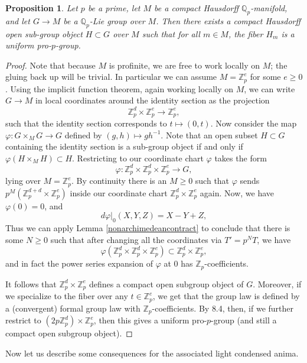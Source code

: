 \documentclass[12pt]{article}
\newtheorem{proposition}[theorem]{Proposition}
\newcommand{\mbb}{\mathbb}
\begin{document}
\begin{proposition}\label{localstructurepadiclie}
Let $p$ be a prime, let $M$ be a compact Hausdorff $\mathbb{Q}_p$-manifold, and let $G\to M$ be a $\mathbb{Q}_p$-Lie group over $M$.  Then there exists a compact Hausdorff open sub-group object $H\subset G$ over $M$ such that for all $m\in M$, the fiber $H_m$ is a uniform pro-$p$-group.
\end{proposition}
\begin{proof}
Note that because $M$ is profinite, we are free to work locally on $M$; the gluing back up will be trivial.  In particular we can assume $M=\mathbb{Z}_p^e$ for some $e\geq 0$.  Using the implicit function theorem, again working locally on $M$, we can write $G\to M$ in local coordinates around the identity section as the projection
$$\mathbb{Z}_p^d \times \mathbb{Z}_p^e \to \mathbb{Z}_p^e,$$
such that the identity section corresponds to $t\mapsto (0,t)$.  Now consider the map $\varphi: G\times_M G\to G$ defined by $(g,h)\mapsto gh^{-1}$.  Note that an open subset $H\subset G$ containing the identity section is a sub-group object if and only if $\varphi(H\times_M H)\subset H$. Restricting to our coordinate chart $\varphi$ takes the form
$$\varphi: \mbb{Z}_p^d\times \mbb{Z}_p^d\times\mbb{Z}_p^e \to G,$$
lying over $M=\mbb{Z}_p^e$.  By continuity there is an $M\geq 0$ such that $\varphi$ sends $p^M(\mbb{Z}_p^{d+d}\times\mbb{Z}_p^e)$ inside our coordinate chart $\mbb{Z}_p^d\times\mbb{Z}_p^e$ again.  Now, we have $\varphi(0)=0$, and
$$d\varphi|_0(X,Y,Z) = X - Y + Z,$$
Thus we can apply Lemma \ref{nonarchimedeancontract} to conclude that there is some $N\geq 0$ such that after changing all the coordinates via $T' = p^NT$, we have
$$\varphi(\mbb{Z}_p^d\times \mbb{Z}_p^d\times\mbb{Z}_p^e)\subset \mbb{Z}_p^d\times \mbb{Z}_p^e,$$
and in fact the power series expansion of $\varphi$ at $0$ has $\mathbb{Z}_p$-coefficients.

It follows that $\mathbb{Z}_p^d\times \mathbb{Z}_p^e$ defines a compact open subgroup object of $G$.  Moreover, if we specialize to the fiber over any $t\in \mbb{Z}_p^e$, we get that the group law is defined by a (convergent) formal group law with $\mathbb{Z}_p$-coefficients.  By \cite{DixonAnalytic} 8.4, then, if we further restrict to $(2p\mathbb{Z}_p^d)\times\mathbb{Z}_p^e$, then this gives a uniform pro-$p$-group (and still a compact open subgroup object).
\end{proof}

Now let us describe some consequences for the associated light condensed anima.
\end{document}

